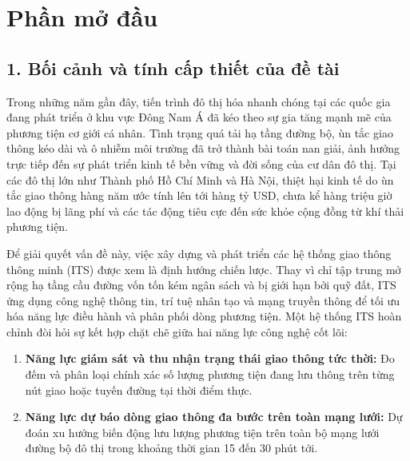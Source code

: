 \chapter*{Phần mở đầu}

\section*{1. Bối cảnh và tính cấp thiết của đề tài}
Trong những năm gần đây, tiến trình đô thị hóa nhanh chóng tại các quốc gia đang phát triển ở khu vực Đông Nam Á đã kéo theo sự gia tăng mạnh mẽ của phương tiện cơ giới cá nhân. Tình trạng quá tải hạ tầng đường bộ, ùn tắc giao thông kéo dài và ô nhiễm môi trường đã trở thành bài toán nan giải, ảnh hưởng trực tiếp đến sự phát triển kinh tế bền vững và đời sống của cư dân đô thị. Tại các đô thị lớn như Thành phố Hồ Chí Minh và Hà Nội, thiệt hại kinh tế do ùn tắc giao thông hàng năm ước tính lên tới hàng tỷ USD, chưa kể hàng triệu giờ lao động bị lãng phí và các tác động tiêu cực đến sức khỏe cộng đồng từ khí thải phương tiện.

Để giải quyết vấn đề này, việc xây dựng và phát triển các hệ thống giao thông thông minh (ITS) được xem là định hướng chiến lược. Thay vì chỉ tập trung mở rộng hạ tầng cầu đường vốn tốn kém ngân sách và bị giới hạn bởi quỹ đất, ITS ứng dụng công nghệ thông tin, trí tuệ nhân tạo và mạng truyền thông để tối ưu hóa năng lực điều hành và phân phối dòng phương tiện. Một hệ thống ITS hoàn chỉnh đòi hỏi sự kết hợp chặt chẽ giữa hai năng lực công nghệ cốt lõi:
\begin{enumerate}
    \item \textbf{Năng lực giám sát và thu nhận trạng thái giao thông tức thời:} Đo đếm và phân loại chính xác số lượng phương tiện đang lưu thông trên từng nút giao hoặc tuyến đường tại thời điểm thực.
    \item \textbf{Năng lực dự báo dòng giao thông đa bước trên toàn mạng lưới:} Dự đoán xu hướng biến động lưu lượng phương tiện trên toàn bộ mạng lưới đường bộ đô thị trong khoảng thời gian 15 đến 30 phút tới.
\end{enumerate}

